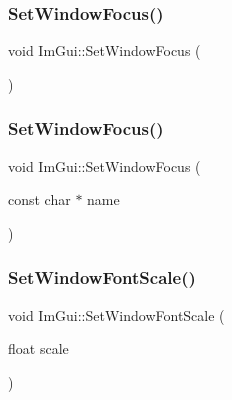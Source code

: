 \hypertarget{namespace_im_gui_ac71920931ed7b7c8594ee84c6a94e7b8}{}\label{namespace_im_gui_ac71920931ed7b7c8594ee84c6a94e7b8} 
\subsubsection{\texorpdfstring{Set\+Window\+Focus()}{SetWindowFocus()}\hspace{0.1cm}{\footnotesize\ttfamily [1/2]}}
{\footnotesize\ttfamily void Im\+Gui\+::\+Set\+Window\+Focus (\begin{DoxyParamCaption}{ }\end{DoxyParamCaption})}

\hypertarget{namespace_im_gui_aa612adbb975051090898f094a1608f24}{}\label{namespace_im_gui_aa612adbb975051090898f094a1608f24} 
\subsubsection{\texorpdfstring{Set\+Window\+Focus()}{SetWindowFocus()}\hspace{0.1cm}{\footnotesize\ttfamily [2/2]}}
{\footnotesize\ttfamily void Im\+Gui\+::\+Set\+Window\+Focus (\begin{DoxyParamCaption}\item[{const char $\ast$}]{name }\end{DoxyParamCaption})}

\hypertarget{namespace_im_gui_a11f2f343dbc9b00ccd9e99ebd59cfe8b}{}\label{namespace_im_gui_a11f2f343dbc9b00ccd9e99ebd59cfe8b} 
\subsubsection{\texorpdfstring{Set\+Window\+Font\+Scale()}{SetWindowFontScale()}}
{\footnotesize\ttfamily void Im\+Gui\+::\+Set\+Window\+Font\+Scale (\begin{DoxyParamCaption}\item[{float}]{scale }\end{DoxyParamCaption})}

\hypertarget{namespace_im_gui_aaa81e004de4c0a5cedb836e92e8aa0e5}{}\label{namespace_im_gui_aaa81e004de4c0a5cedb836e92e8aa0e5} 

